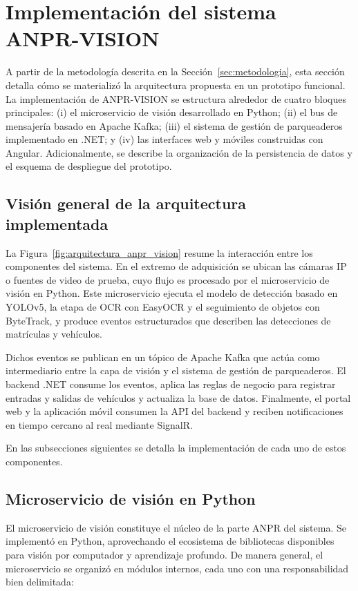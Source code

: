 \section{Implementación del sistema ANPR-VISION}
\label{sec:implementacion}

A partir de la metodología descrita en la Sección~\ref{sec:metodologia}, esta sección detalla cómo se materializó la arquitectura propuesta en un prototipo funcional. La implementación de ANPR-VISION se estructura alrededor de cuatro bloques principales: (i) el microservicio de visión desarrollado en Python; (ii) el bus de mensajería basado en Apache Kafka; (iii) el sistema de gestión de parqueaderos implementado en .NET; y (iv) las interfaces web y móviles construidas con Angular. Adicionalmente, se describe la organización de la persistencia de datos y el esquema de despliegue del prototipo.

\subsection{Visión general de la arquitectura implementada}

La Figura~\ref{fig:arquitectura_anpr_vision} resume la interacción entre los componentes del sistema. En el extremo de adquisición se ubican las cámaras IP o fuentes de video de prueba, cuyo flujo es procesado por el microservicio de visión en Python. Este microservicio ejecuta el modelo de detección basado en YOLOv5, la etapa de OCR con EasyOCR y el seguimiento de objetos con ByteTrack, y produce eventos estructurados que describen las detecciones de matrículas y vehículos.

Dichos eventos se publican en un tópico de Apache Kafka que actúa como intermediario entre la capa de visión y el sistema de gestión de parqueaderos. El backend .NET consume los eventos, aplica las reglas de negocio para registrar entradas y salidas de vehículos y actualiza la base de datos. Finalmente, el portal web y la aplicación móvil consumen la API del backend y reciben notificaciones en tiempo cercano al real mediante SignalR.

En las subsecciones siguientes se detalla la implementación de cada uno de estos componentes.

\subsection{Microservicio de visión en Python}

El microservicio de visión constituye el núcleo de la parte ANPR del sistema. Se implementó en Python, aprovechando el ecosistema de bibliotecas disponibles para visión por computador y aprendizaje profundo. De manera general, el microservicio se organizó en módulos internos, cada uno con una responsabilidad bien delimitada:

